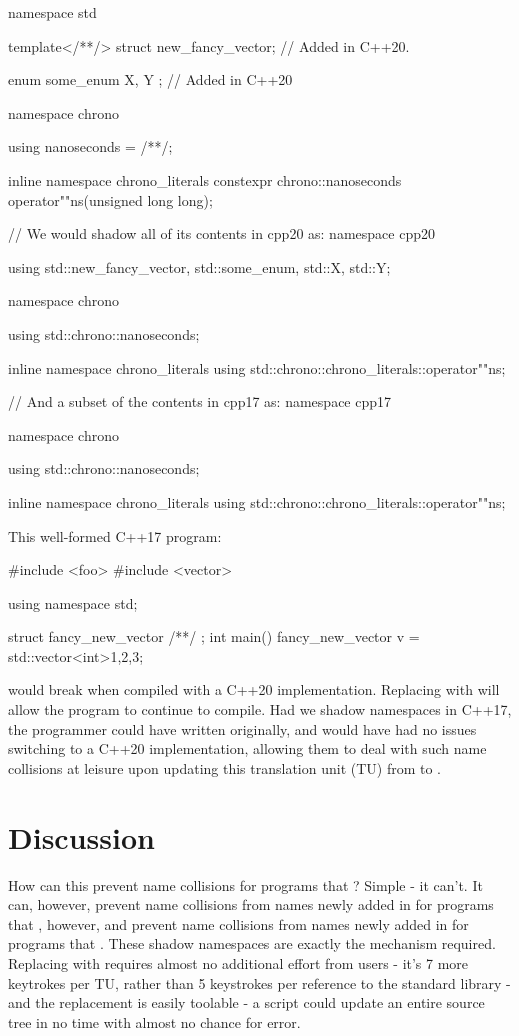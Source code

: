 \begin{codeblock}
namespace std {
  template</**/> struct new_fancy_vector; // Added in C++20.

  enum some_enum { X, Y }; // Added in C++20

  namespace chrono {
    using nanoseconds = /**/;

    inline namespace chrono_literals {
      constexpr chrono::nanoseconds operator""ns(unsigned long long);
    }
  }

  // We would shadow all of its contents in cpp20 as:
  namespace cpp20 {
    using std::new_fancy_vector, std::some_enum, std::X, std::Y;

    namespace chrono {
      using std::chrono::nanoseconds;

      inline namespace chrono_literals {
        using std::chrono::chrono_literals::operator""ns;
      }
    }
  }

  // And a subset of the contents in cpp17 as:
  namespace cpp17 {
    namespace chrono {
      using std::chrono::nanoseconds;

      inline namespace chrono_literals {
        using std::chrono::chrono_literals::operator""ns;
      }
    }
  }
}
\end{codeblock}

This well-formed C++17 program:
\begin{codeblock}
#include <foo>
#include <vector>

using namespace std;

struct fancy_new_vector { /**/ };
int main() {
  fancy_new_vector v = std::vector<int>{1,2,3};
}
\end{codeblock}

would break when compiled with a C++20 implementation. Replacing
 with  will allow
the program to continue to compile. Had we shadow namespaces in C++17,
the programmer could have written  originally,
and would have had no issues switching to a C++20 implementation, allowing them
to deal with such name collisions at leisure upon updating this translation unit
(TU) from  to .

\section{Discussion}

How can this prevent name collisions for programs that
? Simple - it can't. It can, however, prevent name
collisions from names newly added in  for programs that
, however, and prevent name collisions
from names newly added in  for programs that
. These shadow namespaces are exactly the
mechanism required. Replacing  with
 requires almost no additional effort from
users - it's 7 more keytrokes per TU, rather than 5 keystrokes per reference to
the standard library - and the replacement is easily toolable - a 
script could update an entire source tree in no time with almost no chance for
error.

